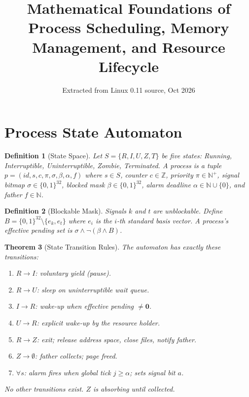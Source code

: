 \documentclass[11pt]{article}
\title{Mathematical Foundations of Process Scheduling, Memory Management,
       and Resource Lifecycle}
\author{Extracted from Linux 0.11 source, Oct 2026}
\date{}
\newtheorem{theorem}{Theorem}[section]
\newtheorem{definition}[theorem]{Definition}
\begin{document}
\maketitle

\section{Process State Automaton}

\begin{definition}[State Space]
Let $S = \{R, I, U, Z, T\}$ be five states:
Running, Interruptible, Uninterruptible, Zombie, Terminated.
A process is a tuple $p = (id, s, c, \pi, \sigma, \beta, \alpha, f)$ where
$s \in S$, counter $c \in \mathbb{Z}$, priority $\pi \in \mathbb{N}^+$,
signal bitmap $\sigma \in \{0,1\}^{32}$, blocked mask $\beta \in \{0,1\}^{32}$,
alarm deadline $\alpha \in \mathbb{N} \cup \{0\}$, and father $f \in \mathbb{N}$.
\end{definition}

\begin{definition}[Blockable Mask]
Signals $k$ and $t$ are unblockable. Define
$B = \{0,1\}^{32} \setminus \{e_k, e_t\}$
where $e_i$ is the $i$-th standard basis vector.
A process's effective pending set is $\sigma \wedge \lnot(\beta \wedge B)$.
\end{definition}

\begin{theorem}[State Transition Rules]
The automaton has exactly these transitions:
\begin{enumerate}
\item $R \to I$: voluntary yield (pause).
\item $R \to U$: sleep on uninterruptible wait queue.
\item $I \to R$: wake-up when effective pending $\neq \mathbf{0}$.
\item $U \to R$: explicit wake-up by the resource holder.
\item $R \to Z$: exit; release address space, close files, notify father.
\item $Z \to \emptyset$: father collects; page freed.
\item $\forall s$: alarm fires when global tick $j \geq \alpha$; sets signal bit $a$.
\end{enumerate}
No other transitions exist. $Z$ is absorbing until collected.
\end{theorem}
\end{document}
